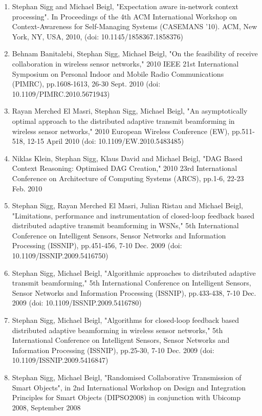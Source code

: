 \documentclass[10pt]{article}
\begin{document}
\begin{enumerate}
\item Stephan Sigg and Michael Beigl, "Expectation aware in-network context processing". In Proceedings of the 4th ACM International Workshop on Context-Awareness for Self-Managing Systems (CASEMANS '10). ACM, New York, NY, USA, 2010, (doi: 10.1145/1858367.1858376)
\item Behnam Banitalebi, Stephan Sigg, Michael Beigl, "On the feasibility of receive collaboration in wireless sensor networks," 2010 IEEE 21st International Symposium on Personal Indoor and Mobile Radio Communications (PIMRC), pp.1608-1613, 26-30 Sept. 2010 (doi: 10.1109/PIMRC.2010.5671943)
\item Rayan Merched El Masri, Stephan Sigg, Michael Beigl, "An asymptotically optimal approach to the distributed adaptive transmit beamforming in wireless sensor networks," 2010 European Wireless Conference (EW), pp.511-518, 12-15 April 2010 (doi: 10.1109/EW.2010.5483485)
\item Niklas Klein, Stephan Sigg, Klaus David and Michael Beigl, "DAG Based Context Reasoning: Optimised DAG Creation," 2010 23rd International Conference on Architecture of Computing Systems (ARCS), pp.1-6, 22-23 Feb. 2010
\item Stephan Sigg, Rayan Merched El Masri, Julian Ristau and Michael Beigl, "Limitations, performance and instrumentation of closed-loop feedback based distributed adaptive transmit beamforming in WSNs," 5th International Conference on Intelligent Sensors, Sensor Networks and Information Processing (ISSNIP), pp.451-456, 7-10 Dec. 2009 (doi: 10.1109/ISSNIP.2009.5416750)
\item Stephan Sigg, Michael Beigl, "Algorithmic approaches to distributed adaptive transmit beamforming," 5th International Conference on Intelligent Sensors, Sensor Networks and Information Processing (ISSNIP), pp.433-438, 7-10 Dec. 2009 (doi: 10.1109/ISSNIP.2009.5416780)
\item Stephan Sigg, Michael Beigl, "Algorithms for closed-loop feedback based distributed adaptive beamforming in wireless sensor networks," 5th International Conference on Intelligent Sensors, Sensor Networks and Information Processing (ISSNIP), pp.25-30, 7-10 Dec. 2009 (doi: 10.1109/ISSNIP.2009.5416847)
\item Stephan Sigg, Michael Beigl, "Randomised Collaborative Transmission of Smart Objects", in 2nd International Workshop on Design and Integration Principles for Smart Objects (DIPSO2008) in conjunction with Ubicomp 2008, September 2008

\end{enumerate}
\end{document}
